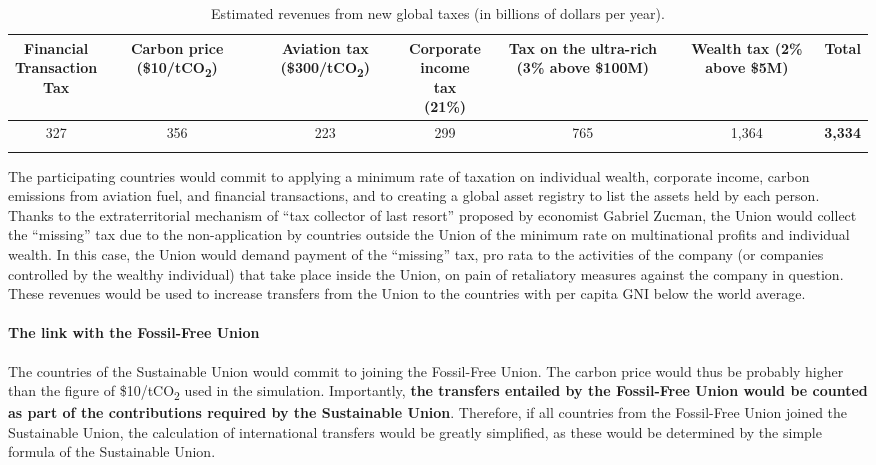 \documentclass[12pt,english]{article}
\newcommand{\bo}[1]{\textbf{#1}}
\begin{document}
\begin{table}[h!]
  \centering 
  \caption{Estimated revenues from new global taxes (in billions of dollars per year).\label{tab:su}}
  \begin{tabular}[t]{ccccccc}
  \toprule
  \makecell{Financial\\Transaction\\Tax} & \makecell{Carbon\\price\\(\$10/tCO\textsubscript{2})} & \makecell{Aviation\\tax\\(\$300/tCO\textsubscript{2})} & \makecell{Corporate\\income tax\\(21\%)} & \makecell{Tax on the\\ultra-rich\\(3\% above\\ \$100M)} & \makecell{Wealth tax\\(2\% above\\ \$5M)} & \bo{Total} \\
  \midrule
  327 & 356 & 223 & 299 & 765 & 1,364 & \bo{3,334} \\
  \bottomrule\\[-0.81em]
  \end{tabular}
\end{table}

The participating countries would commit to applying a minimum rate of taxation on individual wealth, corporate income, carbon emissions from aviation fuel, and financial transactions, and to creating a global asset registry to list the assets held by each person. 
Thanks to the extraterritorial mechanism of ``tax collector of last resort'' proposed by economist Gabriel Zucman,\cite{zucman_blueprint_2024} the Union would collect the ``missing'' tax due to the non-application by countries outside the Union of the minimum rate on multinational profits and individual wealth. In this case, the Union would demand payment of the ``missing'' tax, pro rata to the activities of the company (or companies controlled by the wealthy individual) that take place inside the Union, on pain of retaliatory measures against the company in question. These revenues would be used to increase transfers from the Union to the countries with per capita GNI below the world average. 

\paragraph{The link with the Fossil-Free Union}
The countries of the Sustainable Union would commit to joining the Fossil-Free Union. The carbon price would thus be probably higher than the figure of \$10/tCO\textsubscript{2} used in the simulation. Importantly, \textbf{the transfers entailed by the Fossil-Free Union would be counted as part of the contributions required by the Sustainable Union}. Therefore, if all countries from the Fossil-Free Union joined the Sustainable Union, the calculation of international transfers would be greatly simplified, as these would be determined by the simple formula of the Sustainable Union. 
\end{document}
